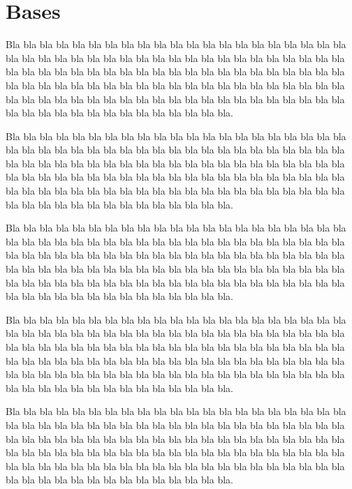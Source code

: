 \documentclass[french]{report}
\begin{document}

\clearpage
\tableofcontents
\clearpage


\chapter{Bases}

Bla bla bla bla bla bla bla bla bla bla bla bla bla bla bla bla bla bla bla bla bla bla bla bla bla bla bla bla bla bla bla bla bla bla bla bla bla bla bla bla bla bla bla bla bla bla bla bla bla bla bla bla bla bla bla bla bla bla bla bla bla bla bla bla bla bla bla bla bla bla bla bla bla bla bla bla bla bla bla bla bla bla bla bla bla bla bla bla bla bla bla bla bla bla bla bla bla bla bla bla bla bla bla bla bla bla bla bla bla bla bla bla bla bla bla bla bla bla bla.
\bigskip

Bla bla bla bla bla bla bla bla bla bla bla bla bla bla bla bla bla bla bla bla bla bla bla bla bla bla bla bla bla bla bla bla bla bla bla bla bla bla bla bla bla bla bla bla bla bla bla bla bla bla bla bla bla bla bla bla bla bla bla bla bla bla bla bla bla bla bla bla bla bla bla bla bla bla bla bla bla bla bla bla bla bla bla bla bla bla bla bla bla bla bla bla bla bla bla bla bla bla bla bla bla bla bla bla bla bla bla bla bla bla bla bla bla bla bla bla bla bla bla.
\medskip

Bla bla bla bla bla bla bla bla bla bla bla bla bla bla bla bla bla bla bla bla bla bla bla bla bla bla bla bla bla bla bla bla bla bla bla bla bla bla bla bla bla bla bla bla bla bla bla bla bla bla bla bla bla bla bla bla bla bla bla bla bla bla bla bla bla bla bla bla bla bla bla bla bla bla bla bla bla bla bla bla bla bla bla bla bla bla bla bla bla bla bla bla bla bla bla bla bla bla bla bla bla bla bla bla bla bla bla bla bla bla bla bla bla bla bla bla bla bla bla.
\smallskip

Bla bla bla bla bla bla bla bla bla bla bla bla bla bla bla bla bla bla bla bla bla bla bla bla bla bla bla bla bla bla bla bla bla bla bla bla bla bla bla bla bla bla bla bla bla bla bla bla bla bla bla bla bla bla bla bla bla bla bla bla bla bla bla bla bla bla bla bla bla bla bla bla bla bla bla bla bla bla bla bla bla bla bla bla bla bla bla bla bla bla bla bla bla bla bla bla bla bla bla bla bla bla bla bla bla bla bla bla bla bla bla bla bla bla bla bla bla bla bla.

Bla bla bla bla bla bla bla bla bla bla bla bla bla bla bla bla bla bla bla bla bla bla bla bla bla bla bla bla bla bla bla bla bla bla bla bla bla bla bla bla bla bla bla bla bla bla bla bla bla bla bla bla bla bla bla bla bla bla bla bla bla bla bla bla bla bla bla bla bla bla bla bla bla bla bla bla bla bla bla bla bla bla bla bla bla bla bla bla bla bla bla bla bla bla bla bla bla bla bla bla bla bla bla bla bla bla bla bla bla bla bla bla bla bla bla bla bla bla bla.
\end{document}
